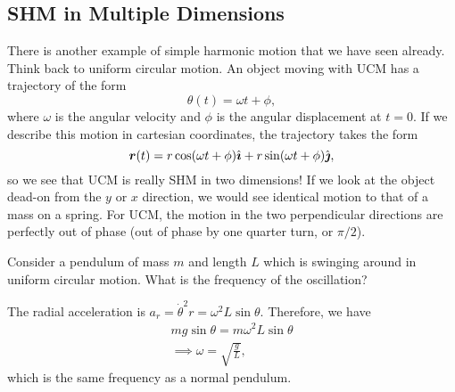 \documentclass[../classical_mechanics.tex]{subfiles}
\begin{document}
        \subsection{SHM in Multiple Dimensions}\label{subsec:SHM-in-multiple-dimensions}
            There is another example of simple harmonic motion that we have seen already.
            Think back to uniform circular motion.
            An object moving with UCM has a trajectory of the form
            \begin{equation}
                \theta(t)=\omega t+\phi,
            \end{equation}
            where $\omega$ is the angular velocity and $\phi$ is the angular displacement at $t=0$.
            If we describe this motion in cartesian coordinates, the trajectory takes the form
            \begin{equation}
                \boldsymbol{r}(t)=r\cos(\omega t+\phi)\hat{\boldsymbol{\imath}}+r\sin(\omega t+\phi)\hat{\boldsymbol{\jmath}},
            \end{equation}
            so we see that UCM is really SHM in two dimensions!
            If we look at the object dead-on from the $y$ or $x$ direction, we would see identical motion to that of a mass on a spring.
            For UCM, the motion in the two perpendicular directions are perfectly out of phase (out of phase by one quarter turn, or $\pi/2$).
            \begin{example}
                Consider a pendulum of mass $m$ and length $L$ which is swinging around in uniform circular motion.
                What is the frequency of the oscillation?

                The radial acceleration is $a_r=\dot{\theta}^2r=\omega^2L\sin\theta$.
                Therefore, we have
                \begin{gather}
                    mg\sin\theta=m\omega^2L\sin\theta\\
                    \implies\omega=\sqrt{\frac{g}{L}},
                \end{gather}
                which is the same frequency as a normal pendulum.
            \end{example}
\end{document}
